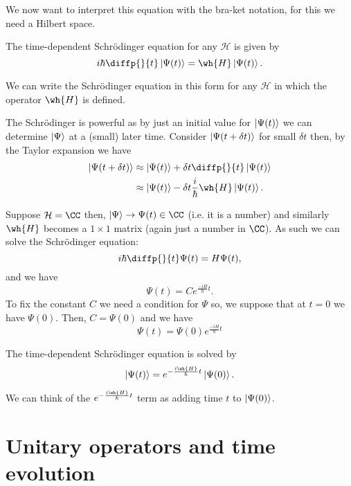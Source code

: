 \documentclass[12pt, a4paper]{article}
\begin{document}
We now want to interpret this equation with the bra-ket notation, for this we need a Hilbert space.

\begin{mdthm}
    The time-dependent Schrödinger equation for any \(\mathcal{H}\) is given by 
    \[i\hbar \diffp{}{t} \ket{\Psi(t)} = \wh{H} \ket{\Psi(t)}.\]
\end{mdthm}

\begin{mdremark}
    We can write the Schrödinger equation in this form for any \(\mathcal{H}\) in which the operator \(\wh{H}\) is defined.
\end{mdremark}

The Schrödinger is powerful as by just an initial value for \(\ket{\Psi(t)}\) we can determine \(\ket{\Psi}\) at a (small) later time. Consider \(\ket{\Psi(t+\delta t)}\) for small \(\delta t\) then, by the Taylor expansion we have
\[\begin{aligned}
    \ket{\Psi(t+\delta t)} &\approx \ket{\Psi(t)} +\delta t \diffp{}{t}\ket{\Psi(t)} \\
    &\approx \ket{\Psi(t)} - \delta t\frac{i}{\hbar}\wh{H} \ket{\Psi(t)}.
\end{aligned}\]

\begin{example}
    Suppose \(\mathcal{H} = \CC\) then, \(\ket{\Psi}\to \Psi(t) \in \CC\) (i.e. it is a number) and similarly \(\wh{H}\) becomes a \(1 \times 1\) matrix (again just a number in \(\CC\)). As such we can solve the Schrödinger equation:
    \[i\hbar \diffp{}{t} \Psi(t) = H\Psi(t),\]
    and we have 
    \[\Psi(t) = Ce^{\frac{-iH}{\hbar}t}.\]
    To fix the constant \(C\) we need a condition for \(\Psi\) so, we suppose that at \(t=0\) we have \(\Psi(0)\). Then, \(C=\Psi(0)\) and we have 
    \[\Psi(t) = \Psi(0)e^{\frac{-iH}{\hbar}t}\]
\end{example}

\begin{mdthm}
    The time-dependent Schrödinger equation is solved by 
    \[\ket{\Psi(t)} = e^{-\frac{i\wh{H}}{\hbar}t} \ket{\Psi(0)}.\]
\end{mdthm}

\begin{mdremark}
    We can think of the \(e^{-\frac{i\wh{H}}{\hbar}t}\) term as adding time \(t\) to \(\ket{\Psi(0)}\).
\end{mdremark}

\section{Unitary operators and time evolution}
\end{document}
